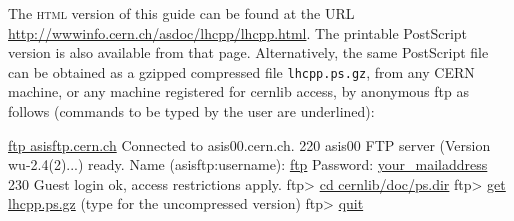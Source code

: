 The \textsc{html} version of this guide can be found at the URL
\url{http://wwwinfo.cern.ch/asdoc/lhcpp/lhcpp.html}. The printable
PostScript version is also available from that page.  Alternatively,
the same PostScript file can be obtained as a gzipped compressed file
\texttt{lhcpp.ps.gz}, from any CERN machine, or any machine registered
for cernlib access, by anonymous ftp as follows (commands to be typed
by the user are underlined):

\vspace*{3mm} 
\begin{XMP}
    \underline{ftp asisftp.cern.ch}
    Connected to asis00.cern.ch.
    220 asis00 FTP server (Version wu-2.4(2)...) ready.
    Name (asisftp:username): \underline{ftp}
    Password: \underline{your\_{}mailaddress}
    230 Guest login ok, access restrictions apply.
    ftp> \underline{cd cernlib/doc/ps.dir}
    ftp> \underline{get lhcpp.ps.gz}    (type  for the uncompressed version)
    ftp> \underline{quit}
\end{XMP}

\newpage
\tableofcontents
\newpage
\listoffigures
\endinput


